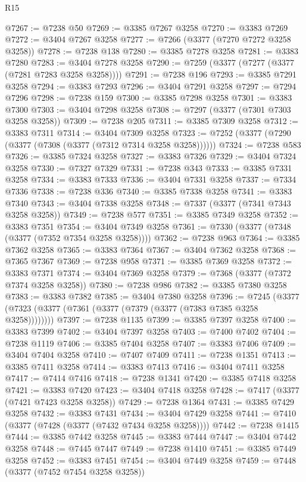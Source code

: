 \begin{lexlean}{R15}
\begin{coremodule}
@7267 := @7238 @50
@7269 := @3385 @7267 @3258
@7270 := @3383 @7269
@7272 := @3404 @7267 @3258
@7277 := @7266 (@3377 (@7270 @7272 @3258 @3258))
@7278 := @7238 @138
@7280 := @3385 @7278 @3258
@7281 := @3383 @7280
@7283 := @3404 @7278 @3258
@7290 := @7259 (@3377 (@7277 (@3377 (@7281 @7283 @3258 @3258))))
@7291 := @7238 @196
@7293 := @3385 @7291 @3258
@7294 := @3383 @7293
@7296 := @3404 @7291 @3258
@7297 := @7294 @7296
@7298 := @7238 @159
@7300 := @3385 @7298 @3258
@7301 := @3383 @7300
@7303 := @3404 @7298 @3258
@7308 := @7297 (@3377 (@7301 @7303 @3258 @3258))
@7309 := @7238 @205
@7311 := @3385 @7309 @3258
@7312 := @3383 @7311
@7314 := @3404 @7309 @3258
@7323 := @7252 (@3377 (@7290 (@3377 (@7308 (@3377 (@7312 @7314 @3258 @3258))))))
@7324 := @7238 @583
@7326 := @3385 @7324 @3258
@7327 := @3383 @7326
@7329 := @3404 @7324 @3258
@7330 := @7327 @7329
@7331 := @7238 @343
@7333 := @3385 @7331 @3258
@7334 := @3383 @7333
@7336 := @3404 @7331 @3258
@7337 := @7334 @7336
@7338 := @7238 @336
@7340 := @3385 @7338 @3258
@7341 := @3383 @7340
@7343 := @3404 @7338 @3258
@7348 := @7337 (@3377 (@7341 @7343 @3258 @3258))
@7349 := @7238 @577
@7351 := @3385 @7349 @3258
@7352 := @3383 @7351
@7354 := @3404 @7349 @3258
@7361 := @7330 (@3377 (@7348 (@3377 (@7352 @7354 @3258 @3258))))
@7362 := @7238 @963
@7364 := @3385 @7362 @3258
@7365 := @3383 @7364
@7367 := @3404 @7362 @3258
@7368 := @7365 @7367
@7369 := @7238 @958
@7371 := @3385 @7369 @3258
@7372 := @3383 @7371
@7374 := @3404 @7369 @3258
@7379 := @7368 (@3377 (@7372 @7374 @3258 @3258))
@7380 := @7238 @986
@7382 := @3385 @7380 @3258
@7383 := @3383 @7382
@7385 := @3404 @7380 @3258
@7396 := @7245 (@3377 (@7323 (@3377 (@7361 (@3377 (@7379 (@3377 (@7383 @7385 @3258 @3258))))))))
@7397 := @7238 @1135
@7399 := @3385 @7397 @3258
@7400 := @3383 @7399
@7402 := @3404 @7397 @3258
@7403 := @7400 @7402
@7404 := @7238 @1119
@7406 := @3385 @7404 @3258
@7407 := @3383 @7406
@7409 := @3404 @7404 @3258
@7410 := @7407 @7409
@7411 := @7238 @1351
@7413 := @3385 @7411 @3258
@7414 := @3383 @7413
@7416 := @3404 @7411 @3258
@7417 := @7414 @7416
@7418 := @7238 @1341
@7420 := @3385 @7418 @3258
@7421 := @3383 @7420
@7423 := @3404 @7418 @3258
@7428 := @7417 (@3377 (@7421 @7423 @3258 @3258))
@7429 := @7238 @1364
@7431 := @3385 @7429 @3258
@7432 := @3383 @7431
@7434 := @3404 @7429 @3258
@7441 := @7410 (@3377 (@7428 (@3377 (@7432 @7434 @3258 @3258))))
@7442 := @7238 @1415
@7444 := @3385 @7442 @3258
@7445 := @3383 @7444
@7447 := @3404 @7442 @3258
@7448 := @7445 @7447
@7449 := @7238 @1410
@7451 := @3385 @7449 @3258
@7452 := @3383 @7451
@7454 := @3404 @7449 @3258
@7459 := @7448 (@3377 (@7452 @7454 @3258 @3258))

\end{coremodule}
\end{lexlean}
